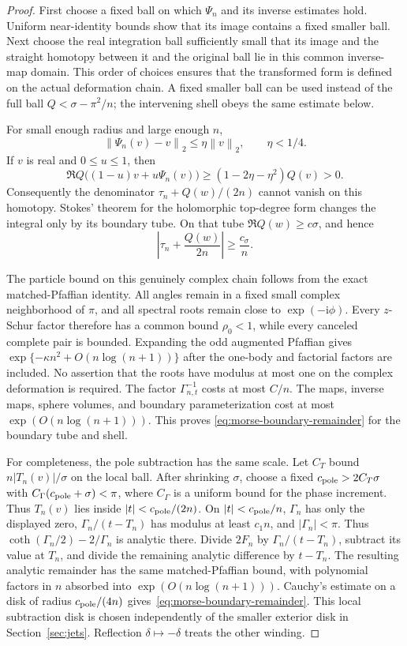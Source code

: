 \documentclass[11pt]{article}
\numberwithin{equation}{section}
\theoremstyle{definition}
\newcommand{\ii}{\mathrm i}
\newcommand{\norm}[1]{\left\lVert#1\right\rVert}
\begin{document}
\begin{proof}
First choose a fixed ball on which $\Psi_n$ and its inverse estimates
hold.  Uniform near-identity bounds show that its image contains a
fixed smaller ball.  Next choose the real integration ball sufficiently
small that its image and the straight homotopy between it and the
original ball lie in this common inverse-map domain.  This order of
choices ensures that the transformed form is defined on the actual
deformation chain.  A fixed smaller ball can be used instead of the
full ball $Q<\sigma-\pi^2/n$; the intervening shell obeys the same
estimate below.

For small enough radius and large enough $n$,
\[
 \norm{\Psi_n(v)-v}_2\le\eta\norm v_2,\qquad \eta<1/4.
\]
If $v$ is real and $0\le u\le1$, then
\begin{equation}
 \Re Q\bigl((1-u)v+u\Psi_n(v)\bigr)
 \ge(1-2\eta-\eta^2)Q(v)>0.
 \label{eq:morse-homotopy-positive}
\end{equation}
Consequently the denominator $\tau_n+Q(w)/(2n)$ cannot vanish on
this homotopy.  Stokes' theorem for the holomorphic top-degree form
changes the integral only by its boundary tube.  On that tube
$\Re Q(w)\ge c\sigma$, and hence
\[
 \left|\tau_n+\frac{Q(w)}{2n}\right|\ge\frac{c_\sigma}{n}.
\]

The particle bound on this genuinely complex chain follows from the
exact matched-Pfaffian identity.  All angles remain in a fixed small
complex neighborhood of $\pi$, and all spectral roots remain close
to $\exp(-\ii\phi)$.  Every $z$-Schur factor therefore has a common
bound $\rho_0<1$, while every canceled complete pair is bounded.
Expanding the odd augmented Pfaffian gives
$\exp\{-\kappa n^2+O(n\log(n+1))\}$ after the one-body and factorial
factors are included.  No assertion that the roots have modulus at
most one on the complex deformation is required.  The factor
$\Gamma_{n,t}^{-1}$ costs at most $C/n$.  The maps, inverse maps,
sphere volumes, and boundary parameterization cost at most
$\exp(O(n\log(n+1)))$.  This proves
\eqref{eq:morse-boundary-remainder} for the boundary tube and shell.

For completeness, the pole subtraction has the same scale.  Let $C_T$
bound $n|T_n(v)|/\sigma$ on the local ball. After shrinking $\sigma$,
choose a fixed $c_{\rm pole}>2C_T\sigma$ with
$C_\Gamma(c_{\rm pole}+\sigma)<\pi$, where $C_\Gamma$ is a uniform
bound for the phase increment. Thus $T_n(v)$ lies inside
$|t|<c_{\rm pole}/(2n)$. On $|t|<c_{\rm pole}/n$,
$\Gamma_n$ has only the displayed zero,
$\Gamma_n/(t-T_n)$ has modulus at least $c_1n$, and
$|\Gamma_n|<\pi$.  Thus
$\coth(\Gamma_n/2)-2/\Gamma_n$ is analytic there.  Divide
$2F_n$ by $\Gamma_n/(t-T_n)$, subtract its value at $T_n$, and
divide the remaining analytic difference by $t-T_n$.
The resulting analytic remainder has the same matched-Pfaffian
bound, with polynomial factors in $n$ absorbed into
$\exp(O(n\log(n+1)))$.  Cauchy's estimate on a disk of radius
$c_{\rm pole}/(4n)$ gives~\eqref{eq:morse-boundary-remainder}. This
local subtraction disk is chosen independently of the smaller exterior
disk in Section~\ref{sec:jets}. Reflection
$\delta\mapsto-\delta$ treats the other winding.
\end{proof}
\end{document}
